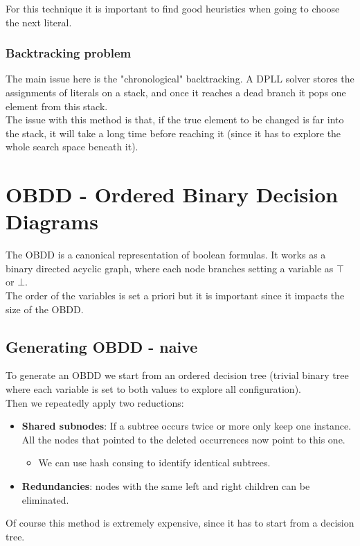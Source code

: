 \documentclass{article}
\begin{document}
For this technique it is important to find good heuristics when going to choose the next literal.

\subsubsection{Backtracking problem}
The main issue here is the "chronological" backtracking. A DPLL solver stores the assignments of literals on a stack, and once it reaches a dead branch it pops one element from this stack.\\
The issue with this method is that, if the true element to be changed is far into the stack, it will take a long time before reaching it (since it has to explore the whole search space beneath it).

\section{OBDD - Ordered Binary Decision Diagrams}
The OBDD is a canonical representation of boolean formulas. It works as a binary directed acyclic graph, where each node branches setting a variable as $\top$ or $\bot$.\\
The order of the variables is set a priori but it is important since it impacts the size of the OBDD.

\subsection{Generating OBDD - naive}
To generate an OBDD we start from an ordered decision tree (trivial binary tree where each variable is set to both values to explore all configuration).\\
Then we repeatedly apply two reductions:
\begin{itemize}
    \item \textbf{Shared subnodes}: If a subtree occurs twice or more only keep one instance. All the nodes that pointed to the deleted occurrences now point to this one.
        \begin{itemize}
            \item We can use hash consing to identify identical subtrees.
        \end{itemize}
    \item \textbf{Redundancies}: nodes with the same left and right children can be eliminated.
\end{itemize}
Of course this method is extremely expensive, since it has to start from a decision tree.
\end{document}
